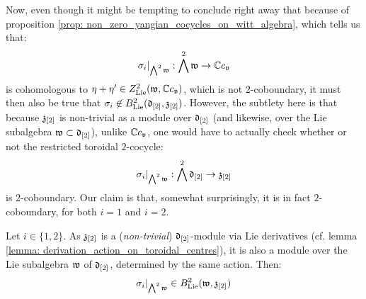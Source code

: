         Now, even though it might be tempting to conclude right away that because of proposition \ref{prop: non_zero_yangian_cocycles_on_witt_algebra}, which tells us that:
            $$\sigma_i|_{\bigwedge^2 \mathfrak{w}}: \bigwedge^2 \mathfrak{w} \to \mathbb{C} c_{\mathfrak{v}}$$
        is cohomologous to $\eta + \eta' \in Z^2_{\mathrm{Lie}}(\mathfrak{w}, \mathbb{C} c_{\mathfrak{v}})$, which is not $2$-coboundary, it must then also be true that $\sigma_i \not \in B^2_{\mathrm{Lie}}(\mathfrak{d}_{[2]}, \mathfrak{z}_{[2]})$. However, the subtlety here is that because $\mathfrak{z}_{[2]}$ is non-trivial as a module over $\mathfrak{d}_{[2]}$ (and likewise, over the Lie subalgebra $\mathfrak{w} \subset \mathfrak{d}_{[2]}$), unlike $\mathbb{C} c_{\mathfrak{v}}$, one would have to actually check whether or not the restricted toroidal $2$-cocycle:
            $$\sigma_i|_{\bigwedge^2 \mathfrak{w}}: \bigwedge^2 \mathfrak{d}_{[2]} \to \mathfrak{z}_{[2]}$$
        is $2$-coboundary. Our claim is that, somewhat surprisingly, it is in fact $2$-coboundary, for both $i = 1$ and $i = 2$.
        \begin{proposition} \label{prop: non_trivial_yangian_restricted_coboundaries_examples}
            Let $i \in \{1, 2\}$. As $\mathfrak{z}_{[2]}$ is a (\textit{non-trivial}) $\mathfrak{d}_{[2]}$-module via Lie derivatives (cf. lemma \ref{lemma: derivation_action_on_toroidal_centres}), it is also a module over the Lie subalgebra $\mathfrak{w}$ of $\mathfrak{d}_{[2]}$, determined by the same action. Then:
                $$\sigma_i|_{ \bigwedge^2 \mathfrak{w} } \in B^2_{\mathrm{Lie}}(\mathfrak{w}, \mathfrak{z}_{[2]})$$
        \end{proposition}
